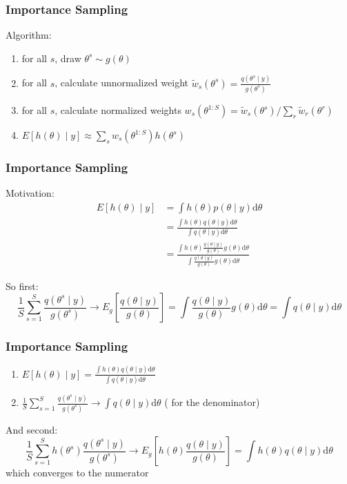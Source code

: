 \documentclass{beamer}
\begin{document}
\begin{frame}[fragile]
\frametitle{Importance Sampling}

Algorithm:
\begin{enumerate}
\item for all $s$, draw $\theta^s \sim g(\theta)$
\item for all $s$, calculate unnormalized weight $\tilde{w}_s(\theta^{s}) = \frac{q(\theta^s \mid y)}{g(\theta^s)}$
\item for all $s$, calculate normalized weights $w_s(\theta^{1:S}) = \tilde{w}_s(\theta^s)/\sum_r \tilde{w}_r(\theta^r)$
\item $E[h(\theta) \mid y] \approx \sum_s w_s(\theta^{1:S}) h(\theta^s)$
\end{enumerate}

\end{frame}

\begin{frame}[fragile]
\frametitle{Importance Sampling}

Motivation:
\begin{align*}
E[h(\theta) \mid y] &= \int h(\theta) p(\theta \mid y) \text{d}\theta \\
&= \frac{\int h(\theta) q(\theta \mid y) \text{d}\theta }{\int q(\theta \mid y) \text{d}\theta } \\
&= \frac{\int h(\theta) \frac{q(\theta \mid y)}{g(\theta)}g(\theta) \text{d}\theta }{\int \frac{q(\theta \mid y)}{g(\theta)}g(\theta) \text{d}\theta } 
\end{align*}
\newline
\pause

So first:
\[
\frac{1}{S}\sum_{s=1}^S \frac{q(\theta^s \mid y)}{g(\theta^s)} \to E_g\left[\frac{q(\theta \mid y)}{g(\theta)} \right] = \int \frac{q(\theta \mid y)}{g(\theta)} g(\theta) \text{d}\theta = \int q(\theta \mid y) \text{d}\theta
\]

\end{frame}

\begin{frame}[fragile]
\frametitle{Importance Sampling}

\begin{enumerate}
\item $E[h(\theta) \mid y] = \frac{\int h(\theta) q(\theta \mid y) \text{d}\theta }{\int q(\theta \mid y) \text{d}\theta } $
\item $\frac{1}{S}\sum_{s=1}^S \frac{q(\theta^s \mid y)}{g(\theta^s)} \to \int q(\theta \mid y) \text{d}\theta$ ( for the denominator)
\end{enumerate}
And second:
\[
\frac{1}{S}\sum_{s=1}^S h(\theta^s) \frac{q(\theta^s \mid y)}{g(\theta^s)} \to E_g\left[h(\theta)\frac{q(\theta \mid y)}{g(\theta)} \right] = \int h(\theta)q(\theta \mid y) \text{d}\theta
\]
which converges to the numerator

\end{frame}
\end{document}
